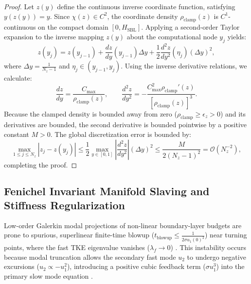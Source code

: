 \begin{proof}
Let $z(y)$ define the continuous inverse coordinate function, satisfying $y(z(y)) = y$. Since $\chi(z) \in C^2$, the coordinate density $\rho_{\text{clamp}}(z)$ is $C^1$-continuous on the compact domain $[0, H_{\text{SBL}}]$. Applying a second-order Taylor expansion to the inverse mapping $z(y)$ about the computational node $y_j$ yields:
\begin{equation}
    z(y_{j}) = z(y_{j-1}) + \frac{dz}{dy}(y_{j-1}) \Delta y + \frac{1}{2}\frac{d^2z}{dy^2}(\eta_j) (\Delta y)^2, \label{eq:taylor_expansion_inverse}
\end{equation}
where $\Delta y = \frac{1}{N_z - 1}$ and $\eta_j \in (y_{j-1}, y_j)$. Using the inverse derivative relations, we calculate:
\begin{equation}
    \frac{dz}{dy} = \frac{C_{\text{max}}}{\rho_{\text{clamp}}(z)}, \qquad \frac{d^2 z}{dy^2} = -\frac{C_{\text{max}}^2 \rho_{\text{clamp}}'(z)}{\left[ \rho_{\text{clamp}}(z) \right]^3}. \label{eq:inverse_derivs_calc}
\end{equation}
Because the clamped density is bounded away from zero ($\rho_{\text{clamp}} \ge \epsilon_z > 0$) and its derivatives are bounded, the second derivative is bounded pointwise by a positive constant $M > 0$. The global discretization error is bounded by:
\begin{equation}
    \max_{1 \le j \le N_z} \left| z_j - z(y_j) \right| \le \frac{1}{2} \max_{y \in [0,1]} \left| \frac{d^2 z}{dy^2} \right| (\Delta y)^2 \le \frac{M}{2 (N_z - 1)^2} = \mathcal{O}\left( N_z^{-2} \right), \label{eq:convergence_bound_step}
\end{equation}
completing the proof.
\end{proof}

\subsection{Fenichel Invariant Manifold Slaving and Stiffness Regularization}

Low-order Galerkin modal projections of non-linear boundary-layer budgets are prone to spurious, superlinear finite-time blowup ($t_{\text{blowup}} \le \frac{1}{2\sigma u_1(0)^2}$) near turning points, where the fast TKE eigenvalue vanishes ($\lambda_f \to 0$) \cite{mcnider1995}. This instability occurs because modal truncation allows the secondary fast mode $u_2$ to undergo negative excursions ($u_2 \propto -u_1^2$), introducing a positive cubic feedback term ($\sigma u_1^3$) into the primary slow mode equation \cite{mcnider1995}.

